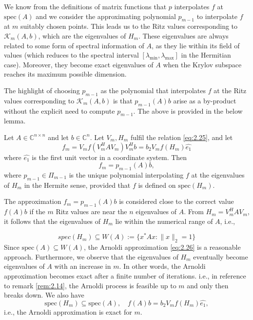 We know from the definitions of matrix functions that $p$ interpolates $f$ at $\text{spec}(A)$ and we consider the approximating polynomial $p_{m-1}$ to interpolate $f$ at $m$ suitably chosen points. This leads us to the Ritz values corresponding to $\mathcal{K}_m(A, b)$, which are the eigenvalues of $H_m$. These eigenvalues are always related to some form of spectral information of $A$, as they lie within its field of values (which reduces to the spectral interval $[\lambda_{\min}, \lambda_{\max}]$ in the Hermitian case). Moreover, they become exact eigenvalues of $A$ when the Krylov subspace reaches its maximum possible dimension\cite{39}.

The highlight of choosing $p_{m-1}$ as the polynomial that interpolates $f$ at the Ritz values corresponding to $\mathcal{K}_m(A, b)$ is that $p_{m-1}(A)b$ arise as a by-product without the explicit need to compute $p_{m-1}$.
The above is provided in the below lemma.

\begin{lemma}
    \label{lem:2.15}
    \cite{8} Let \( A \in \mathbb{C}^{n \times n} \) and let \( b \in \mathbb{C}^n \). Let \( V_m, H_m \) fulfil the relation \ref{eq:2.25}, and let
    \begin{equation}
        f_m = V_m f(V_m^H A V_m) V_m^H b = b_2 V_m f(H_m) \hat{e_1}
        \label{eq:2.26}
    \end{equation}
    where $\hat{e_1}$ is the first unit vector in a coordinate system. Then
    \[ f_m = p_{m-1}(A)b,\]
    where \( p_{m-1} \in \Pi_{m-1} \) is the unique polynomial interpolating \( f \) at the eigenvalues of \( H_m \) in the Hermite sense, provided that \( f \) is defined on \( \text{spec}(H_m) \).
\end{lemma}

The approximation $f_m = p_{m-1}(A)b$ is considered close to the correct value $f(A)b$ if the $m$ Ritz values are near the $n$ eigenvalues of $A$. From $H_m = V_m^H A V_m$, it follows that the eigenvalues of $H_m$ lie within the numerical range of $A$, i.e.,

\[
    spec(H_m) \subseteq W(A) := \{ x^* A x : \|x\|_2 = 1 \}
\]
Since $\text{spec}(A) \subseteq W(A)$, the Arnoldi approximation \ref{eq:2.26} is a reasonable approach. Furthermore, we observe that the eigenvalues of $H_m$ eventually become eigenvalues of $A$ with an increase in $m$. In other words, the Arnoldi approximation becomes exact after a finite number of iterations. i.e., in reference to remark \ref{rem:2.14}, the Arnoldi process is feasible up to $m$ and only then breaks down. We also have
\begin{equation}
    \text{spec}(H_m) \subseteq \text{spec}(A), \quad f(A)b = b_2 V_m f(H_m) \hat{e_1},
    \label{eq:2.27}
\end{equation}
i.e., the Arnoldi approximation is exact for $m$.


